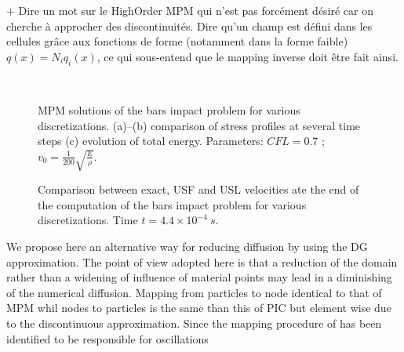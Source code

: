 + Dire un mot sur le HighOrder MPM qui n'est pas forcément désiré car on cherche à approcher des discontinuités.
Dire qu'un champ est défini dans les cellules grâce aux fonctions de forme (notamment dans la forme faible) $q(x)=N_iq_i(x)$, ce qui sous-entend que le mapping inverse doit être fait ainsi.
\begin{figure}[h!]
  \centering
  {  \label{subfig:mpm_diffusion_10}}
  {  \label{subfig:mpm_diffusion_25}}\\
  {  \label{subfig:mpm_energies}}
  \caption{MPM solutions of the bars impact problem for various discretizations. (a)--(b) comparison of stress profiles at several time steps (c) evolution of total energy. Parameters: $CFL=0.7$ ; $v_0=\frac{1}{200}\sqrt{\frac{E}{\rho}}$.}
  \label{fig:mpm_diffusion}
\end{figure}

\begin{figure}[h!]
  \centering
  
  \caption{Comparison between exact, USF and USL velocities ate the end of the computation of the bars impact problem for various discretizations. Time $t=4.4 \times 10^{-4} \:s.$}
  \label{fig:mpm_velocities}
\end{figure}


We propose here an alternative way for reducing diffusion by using the DG approximation. 
The point of view adopted here is that a reduction of the domain rather than a widening of influence of material points may lead in a diminishing of the numerical diffusion. Mapping from particles to node identical to that of MPM whil nodes to particles is the same than this of PIC but element wise due to the discontinuous approximation. Since the mapping procedure of \cite{PIC_Nishiguchi} has been identified to be responsible for oscillations \cite{Mass_Flip}

